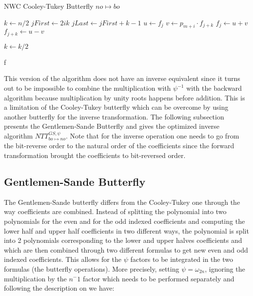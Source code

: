 \begin{algorithm}
    \caption{NWC Cooley-Tukey Butterfly $no \mapsto bo$}
    \label{alg:NWCCTno-bo}
    \begin{algorithmic}[1]

        \State $k \leftarrow n/2$
                \State $jFirst \leftarrow 2ik$
                \State $jLast \leftarrow jFirst + k - 1$
                    \State $u \leftarrow f_{j}$
                    \State $v \leftarrow p_{m + i} \cdot f_{j + k}$
                    \State $f_{j} \leftarrow u + v$
                    \State $f_{j + k} \leftarrow u - v$
                \EndFor
            \EndFor

            \State $k \leftarrow k/2$
        \EndFor

        \Return f

    \EndProcedure

    \end{algorithmic}
\end{algorithm}

This version of the algorithm does not have an inverse equivalent since it turns out to be impossible to combine the multiplication with $\psi^{-1}$ with the backward algorithm because multiplication by unity roots happens before addition. This is a limitation of the Cooley-Tukey butterfly which can be overcome by using another butterfly for the inverse transformation. The following subsection presents the Gentlemen-Sande Butterfly and gives the optimized inverse algorithm $NTT^{GS, \psi}_{bo \mapsto no}$. Note that for the inverse operation one needs to go from the bit-reverse order to the natural order of the coefficients since the forward transformation brought the coefficients to bit-reversed order.

\subsection{Gentlemen-Sande Butterfly}

The Gentlemen-Sande butterfly differs from the Cooley-Tukey one through the way coefficients are combined. Instead of splitting the polynomial into two polynomials for the even and for the odd indexed coefficients and computing the lower half and upper half coefficients in two different ways, the polynomial is split into 2 polynomials corresponding to the lower and upper halves coefficients and which are then combined through two different formulas to get new even and odd indexed coefficients. This allows for the $\psi$ factors to be integrated in the two formulas (the butterfly operations). More precisely, setting $\psi = \omega_{2n}$, ignoring the multiplication by the $n^-1$ factor which needs to be performed separately and following the description on\parencite{10.1007/978-3-319-22174-8_19} we have:

